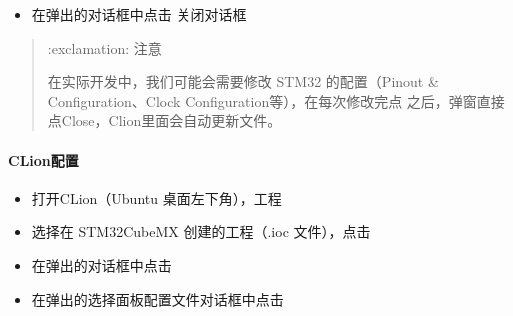 \documentclass[a4paper,12pt,english]{sphinxmanual}
\begin{document}
\sphinxAtStartPar
{}
\begin{itemize}
\item {} 
\sphinxAtStartPar
在弹出的对话框中点击  关闭对话框

\end{itemize}
\begin{quote}

\sphinxAtStartPar
:exclamation: 注意

\sphinxAtStartPar
在实际开发中，我们可能会需要修改 STM32 的配置（Pinout \& Configuration、Clock Configuration等），在每次修改完点  之后，弹窗直接点Close，Clion里面会自动更新文件。
\end{quote}


\paragraph{CLion配置}
\label{\detokenize{exp-stm32/ide-setup:id9}}\begin{itemize}
\item {} 
\sphinxAtStartPar
打开CLion（Ubuntu 桌面左下角），工程

\end{itemize}

\sphinxAtStartPar
{}
\begin{itemize}
\item {} 
\sphinxAtStartPar
选择在 STM32CubeMX 创建的工程（.ioc 文件），点击

\end{itemize}

\sphinxAtStartPar
{}
\begin{itemize}
\item {} 
\sphinxAtStartPar
在弹出的对话框中点击

\item {} 
\sphinxAtStartPar
在弹出的选择面板配置文件对话框中点击

\end{itemize}
\end{document}
